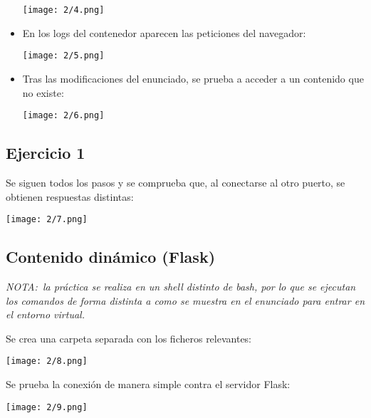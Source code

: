 \begin{itemize}
\begin{minipage}{\linewidth}
			\texttt{[image: 2/4.png]}
			\label{fig:2/4}
		\end{minipage}
	\item En los logs del contenedor aparecen las peticiones del navegador: \\
		\begin{minipage}{\linewidth}
			\centering
			\texttt{[image: 2/5.png]}
			\label{fig:2/5}
		\end{minipage}
	\item Tras las modificaciones del enunciado, se prueba a acceder a un contenido
		que no existe: \\
		\begin{minipage}{\linewidth}
			\centering
			\texttt{[image: 2/6.png]}
			\label{fig:2/6}
		\end{minipage}
\end{itemize}
\subsection{Ejercicio 1}
Se siguen todos los pasos y se comprueba que, al conectarse al otro puerto, se obtienen
respuestas distintas: \\
\begin{minipage}{\linewidth}
	\centering
	\texttt{[image: 2/7.png]}
	\label{fig:2/7}
\end{minipage}

\subsection{Contenido dinámico (Flask)}
\textit{NOTA:~la práctica se realiza en un shell distinto de bash, por lo que se ejecutan
	los comandos de forma distinta a como se muestra en el enunciado para entrar en el
	entorno virtual.}

Se crea una carpeta separada con los ficheros relevantes: \\
\begin{minipage}{\linewidth}
	\centering
	\texttt{[image: 2/8.png]}
	\label{fig:2/8}
\end{minipage}

Se prueba la conexión de manera simple contra el servidor Flask: \\
\begin{minipage}{\linewidth}
	\centering
	\texttt{[image: 2/9.png]}
	\label{fig:2/9}
\end{minipage}

